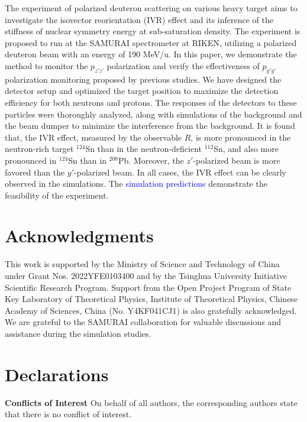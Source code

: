 \documentclass[twocolumn,twoside,showpacs,showkeys,preprintnumbers,superscriptaddress,amsmath,amssymb,prc,nofootinbib,a4paper]{revtex4}
\begin{document}
The experiment of polarized deuteron scattering on various heavy target aims to investigate the isovector reorientation (IVR) effect and its inference of the stiffness of nuclear symmetry energy at sub-saturation density. The experiment is proposed to run at the SAMURAI spectrometer at RIKEN, utilizing a polarized deuteron beam with an energy of 190 MeV/u. In this paper, we demonstrate the method to monitor the $p_{z'z'}$ polarization and verify the effectiveness of $p_{y'y'}$ polarization monitoring proposed by previous studies. We have designed the detector setup and optimized the target position to maximize the detection efficiency for both neutrons and protons. The responses of the detectors to these particles were thoroughly analyzed, along with simulations of the background and the beam dumper to minimize the interference from the background. It is found that, the IVR effect, measured by the observable $R$, is more pronounced in the neutron-rich target $^{124}$Sn than in the neutron-deficient $^{112}$Sn, and also more pronounced in $^{124}$Sn than in $^{208}$Pb. Moreover, the $z'$-polarized beam is more favored than the $y'$-polarized beam.  In all cases, the IVR effect can be clearly observed in the simulations.  The \textcolor{blue}{simulation predictions} demonstrate the feasibility of the experiment.

\section*{Acknowledgments}  

This work is supported by the Ministry of Science and Technology of China under Grant Nos. 2022YFE0103400  and by the Tsinghua University Initiative Scientific Research Program. Support from the Open Project Program of State Key Laboratory of Theoretical Physics, Institute of Theoretical Physics, Chinese Academy of Sciences, China (No. Y4KF041CJ1) is also gratefully acknowledged. 
We are grateful to the SAMURAI collaboration for valuable discussions and assistance during the simulation studies. 

\section*{Declarations}
\textbf{Conflicts of Interest}
On behalf of all authors, the corresponding authors state that there is no conflict of interest.


\end{document}
